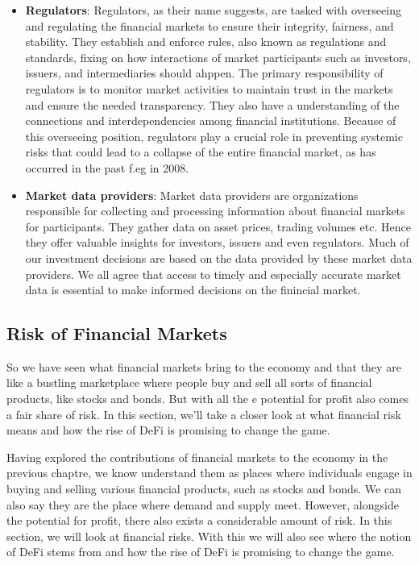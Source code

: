 \documentclass{article}
\begin{document}
\begin{itemize}
\item \textbf{Regulators}:
Regulators, as their name suggests, are tasked with overseeing and regulating the financial markets to ensure their integrity, fairness, and stability. They establish and enforce rules, also known as regulations and standards, fixing on how interactions of market participants such as investors, issuers, and intermediaries should ahppen. The primary responsibility of regulators is to monitor market activities to maintain trust in the markets and ensure the needed transparency. They also have a understanding of the connections and interdependencies among financial institutions. Because of this overseeing position, regulators play a crucial role in preventing systemic risks that could lead to a collapse of the entire financial market, as has occurred in the past f.eg in 2008.

\item \textbf{Market data providers}:
Market data providers are organizations responsible for collecting and processing information about financial markets for participants. They gather data on asset prices, trading volumes etc. Hence they offer valuable insights for investors,  issuers and even regulators. Much of our investment decisions are based on the data provided by these market data providers. We all agree that access to timely and especially accurate market data is essential to make informed decisions on the finincial market.
\end{itemize}

\subsection{Risk of Financial Markets}
So we have seen what financial markets bring to the economy and that they are like a bustling marketplace where people buy and sell all sorts of financial products, like stocks and bonds. But with all the e potential for profit also comes a fair share of risk. In this section, we'll take a closer look at what financial risk means and how the rise of DeFi is promising to change the game.

Having explored the contributions of financial markets to the economy in the previous chaptre, we know understand them as places where individuals engage in buying and selling various financial products, such as stocks and bonds. We can also say they are the place where demand and supply meet. However, alongside the potential for profit, there also exists a considerable amount of risk. In this section, we will look at financial risks. With this we will also see where the notion of DeFi stems from and how the rise of DeFi is promising to change the game.
\end{document}
